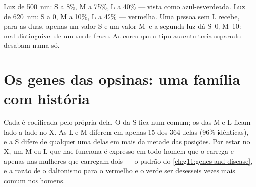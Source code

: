 \begin{example}\label{ex:g11:the-eye:curves}
Luz de \qty{500}{nm}:  S a 8\%, M a 75\%, L a 40\% --- vista como
azul-esverdeada. Luz de \qty{620}{nm}: S a 0, M a 10\%, L a 42\% ---
vermelha. Uma pessoa sem  L recebe, para as duas, apenas um valor
S e um valor M, e a segunda luz dá S~0, M~10: mal distinguível de um
verde fraco. As cores que o tipo ausente teria separado desabam numa só.
\end{example}

\section{Os genes das opsinas: uma família com história}

\begin{proposition}\label{prop:g11:the-eye:genes}
Cada  é codificada pelo  própria dela. O  da  S
fica num  comum; os  das  M e L ficam lado a lado
no  X. As  L e M diferem em apenas 15 dos 364
 delas (96\% idênticas), e a  S difere de qualquer
uma delas em mais da metade das posições. Por estar no X, um  M ou
L que não funciona é expresso em todo homem que o carrega e apenas nas
mulheres que carregam dois --- o padrão do
\cref{ch:g11:genes-and-disease}, e a razão de o daltonismo para o
vermelho e o verde ser dezesseis vezes mais comum nos homens.
\end{proposition}
\admitted

